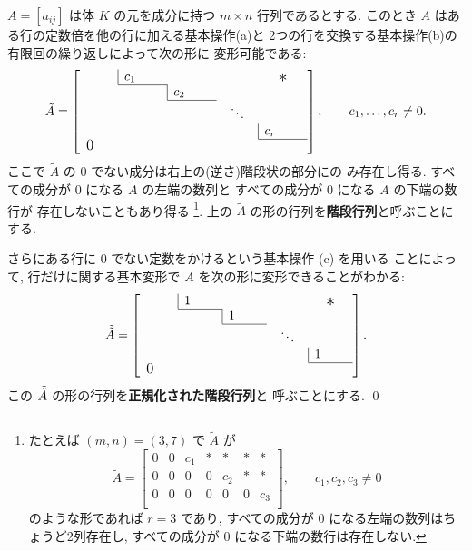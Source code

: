 \documentclass[12pt,twoside]{jarticle}
\begin{document}
\begin{question}[行に関する基本変形による階段行列への変換]
  \label{q:PA}
  $A=[a_{ij}]$ は体 $K$ の元を成分に持つ $m\times n$ 行列であるとする.
  このとき $A$ はある行の定数倍を他の行に加える基本操作(a)と
  2つの行を交換する基本操作(b)の有限回の繰り返しによって次の形に
  変形可能である:
  \begin{equation*}
    \tilde{A} = 
    \left[
      \begin{array}{ccccc}
        \multicolumn{1}{c|}{\qquad} & c_1 \qquad & & & \bigstaru \\
        \cline{2-2}
        \multicolumn{2}{c|}{} & c_2 \qquad & & \\
        \cline{3-3}
        \multicolumn{3}{c}{} & \;\;\ddots\;\; & \\
        \multicolumn{4}{c|}{} & c_r \qquad \\
        \cline{5-5}
        \multicolumn{5}{l}{\bigzerol} \\
      \end{array}
    \right],
    \qquad c_1,\ldots,c_r\ne 0.
  \end{equation*}
  ここで $\tilde{A}$ の $0$ でない成分は右上の(逆さ)階段状の部分にの
  み存在し得る.
  すべての成分が $0$ になる $\tilde{A}$ の左端の数列と
  すべての成分が $0$ になる $\tilde{A}$ の下端の数行が
  存在しないこともあり得る%
  \footnote{たとえば $(m,n)=(3,7)$ で $\tilde{A}$ が
    \begin{equation*}
      \tilde{A} = 
      \begin{bmatrix}
        0 & 0 & c_1 & * & *   & * & *   \\
        0 & 0 & 0   & 0 & c_2 & * & *   \\
        0 & 0 & 0   & 0 & 0   & 0 & c_3 \\
      \end{bmatrix},
      \qquad
      c_1,c_2,c_3\ne 0
    \end{equation*}
    のような形であれば $r=3$ であり, 
    すべての成分が $0$ になる左端の数列はちょうど2列存在し, 
    すべての成分が $0$ になる下端の数行は存在しない.}.
  上の $\tilde{A}$ の形の行列を{\bf 階段行列}と呼ぶことにする.

  さらにある行に $0$ でない定数をかけるという基本操作 (c) を用いる
  ことによって,  
  行だけに関する基本変形で $A$ を次の形に変形できることがわかる:
  \begin{equation*}
    \Tilde{\Tilde{A}} = 
    \left[
      \begin{array}{ccccc}
        \multicolumn{1}{c|}{\qquad} & 1 \qquad & & & \bigstaru \\
        \cline{2-2}
        \multicolumn{2}{c|}{} & 1 \qquad & & \\
        \cline{3-3}
        \multicolumn{3}{c}{} & \;\;\ddots\;\; & \\
        \multicolumn{4}{c|}{} & 1 \qquad \\
        \cline{5-5}
        \multicolumn{5}{l}{\bigzerol} \\
      \end{array}
    \right]. 
  \end{equation*}
  この $\Tilde{\Tilde{A}}$ の形の行列を{\bf 正規化された階段行列}と
  呼ぶことにする.
  \qed
\end{question}
\end{document}
